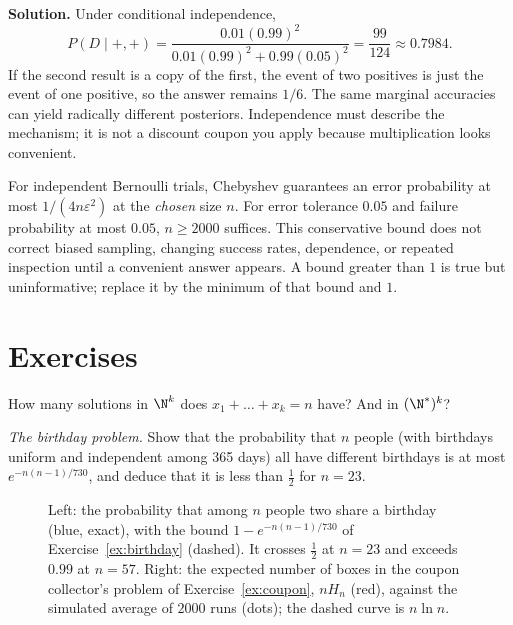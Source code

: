 \textbf{Solution.} Under conditional independence,
\[
P(D\mid+,+)=\frac{0.01(0.99)^2}{0.01(0.99)^2+0.99(0.05)^2}
=\frac{99}{124}\approx0.7984.
\]
If the second result is a copy of the first, the event of two positives is just the event of one positive, so the answer remains $1/6$. The same marginal accuracies can yield radically different posteriors. Independence must describe the mechanism; it is not a discount coupon you apply because multiplication looks convenient.

\begin{reminder}
For independent Bernoulli trials, Chebyshev guarantees an error probability at most $1/(4n\varepsilon^2)$ at the \emph{chosen} size $n$. For error tolerance $0.05$ and failure probability at most $0.05$, $n\ge2000$ suffices. This conservative bound does not correct biased sampling, changing success rates, dependence, or repeated inspection until a convenient answer appears. A bound greater than $1$ is true but uninformative; replace it by the minimum of that bound and $1$.
\end{reminder}


\section{Exercises}

\begin{exercise}[$\star$]\label{ex:stars}
How many solutions in $\N^k$ does $x_1+\dots+x_k=n$ have? And in $(\N^*)^k$?
\end{exercise}

\begin{exercise}[$\star$]\label{ex:birthday}
\emph{The birthday problem.} Show that the probability that $n$ people (with birthdays uniform and independent among 365 days) all have different birthdays is at most
$e^{-n(n-1)/730}$, and deduce that it is less than $\frac12$ for $n=23$.
\end{exercise}

\begin{figure}[ht]
\centering
{}
\caption{Left: the probability that among $n$ people two share a birthday (blue, exact), with the bound $1-e^{-n(n-1)/730}$ of Exercise~\ref{ex:birthday} (dashed). It crosses $\frac12$ at $n=23$ and exceeds $0.99$ at $n=57$. Right: the expected number of boxes in the coupon collector's problem of Exercise~\ref{ex:coupon}, $nH_n$ (red), against the simulated average of $2000$ runs (dots); the dashed curve is $n\ln n$.}
\label{fig:birthday}
\end{figure}

